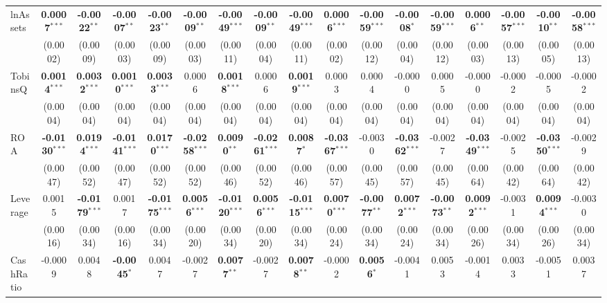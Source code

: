 \documentclass[11pt,a4paper]{article}
\begin{document}
\begin{table}[htbp]
\begin{tabular}{lcccccccccccccccc}
\midrule
lnAssets & \textbf{0.0007}$^{***}$ & \textbf{-0.0022}$^{**}$ & \textbf{-0.0007}$^{**}$ & \textbf{-0.0023}$^{**}$ & \textbf{-0.0009}$^{**}$ & \textbf{-0.0049}$^{***}$ & \textbf{-0.0009}$^{**}$ & \textbf{-0.0049}$^{***}$ & \textbf{0.0006}$^{***}$ & \textbf{-0.0059}$^{***}$ & \textbf{-0.0008}$^{*}$ & \textbf{-0.0059}$^{***}$ & \textbf{0.0006}$^{**}$ & \textbf{-0.0057}$^{***}$ & \textbf{-0.0010}$^{**}$ & \textbf{-0.0058}$^{***}$ \\
 & (0.0002) & (0.0009) & (0.0003) & (0.0009) & (0.0003) & (0.0011) & (0.0004) & (0.0011) & (0.0002) & (0.0012) & (0.0004) & (0.0012) & (0.0003) & (0.0013) & (0.0005) & (0.0013) \\
TobinsQ & \textbf{0.0014}$^{***}$ & \textbf{0.0032}$^{***}$ & \textbf{0.0010}$^{***}$ & \textbf{0.0033}$^{***}$ & 0.0006 & \textbf{0.0018}$^{***}$ & 0.0006 & \textbf{0.0019}$^{***}$ & 0.0003 & 0.0004 & -0.0000 & 0.0005 & -0.0000 & -0.0002 & -0.0005 & -0.0002 \\
 & (0.0004) & (0.0004) & (0.0004) & (0.0004) & (0.0004) & (0.0004) & (0.0004) & (0.0004) & (0.0004) & (0.0004) & (0.0004) & (0.0004) & (0.0004) & (0.0004) & (0.0004) & (0.0004) \\
ROA & \textbf{-0.0130}$^{***}$ & \textbf{0.0194}$^{***}$ & \textbf{-0.0141}$^{***}$ & \textbf{0.0170}$^{***}$ & \textbf{-0.0258}$^{***}$ & \textbf{0.0090}$^{**}$ & \textbf{-0.0261}$^{***}$ & \textbf{0.0087}$^{*}$ & \textbf{-0.0367}$^{***}$ & -0.0030 & \textbf{-0.0362}$^{***}$ & -0.0027 & \textbf{-0.0349}$^{***}$ & -0.0025 & \textbf{-0.0350}$^{***}$ & -0.0029 \\
 & (0.0047) & (0.0052) & (0.0047) & (0.0052) & (0.0052) & (0.0046) & (0.0052) & (0.0046) & (0.0057) & (0.0045) & (0.0057) & (0.0045) & (0.0064) & (0.0042) & (0.0064) & (0.0042) \\
Leverage & 0.0015 & \textbf{-0.0179}$^{***}$ & 0.0017 & \textbf{-0.0175}$^{***}$ & \textbf{0.0056}$^{***}$ & \textbf{-0.0120}$^{***}$ & \textbf{0.0056}$^{***}$ & \textbf{-0.0115}$^{***}$ & \textbf{0.0070}$^{***}$ & \textbf{-0.0077}$^{**}$ & \textbf{0.0072}$^{***}$ & \textbf{-0.0073}$^{**}$ & \textbf{0.0092}$^{***}$ & -0.0031 & \textbf{0.0094}$^{***}$ & -0.0030 \\
 & (0.0016) & (0.0034) & (0.0016) & (0.0034) & (0.0020) & (0.0034) & (0.0020) & (0.0034) & (0.0024) & (0.0034) & (0.0024) & (0.0034) & (0.0026) & (0.0034) & (0.0026) & (0.0034) \\
CashRatio & -0.0009 & 0.0048 & \textbf{-0.0045}$^{*}$ & 0.0047 & -0.0027 & \textbf{0.0077}$^{**}$ & -0.0027 & \textbf{0.0078}$^{**}$ & -0.0002 & \textbf{0.0056}$^{*}$ & -0.0041 & 0.0053 & -0.0014 & 0.0033 & -0.0051 & 0.0037 \\

\end{tabular}
\end{table}
\end{document}

